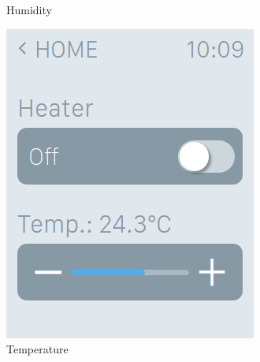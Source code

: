 \documentclass[a4paper,10pt]{article}
\begin{document}
\begin{figure}[!h]
\begin{subfigure}[!h]{0.3\textwidth}
        \caption{Humidity}
    \end{subfigure}
    
    \begin{subfigure}[!h]{0.3\textwidth}
        \includegraphics[width=\textwidth]{images/temperature.png}
        \caption{Temperature}
    \end{subfigure}
    \begin{subfigure}[!h]{0.3\textwidth}

\end{subfigure}
\end{figure}
\end{document}
